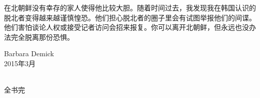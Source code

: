 在北朝鲜没有幸存的家人使得他比较大胆。随着时间过去，我发现我在韩国认识的脱北者变得越来越谨慎惶恐。他们担心脱北者的圈子里会有试图举报他们的间谍。他们害怕谈论人权或接受记者访问会招来报复。你可以离开北朝鲜，但永远也没办法完全脱离那份恐惧。\\

\begin{flushright}
	Barbara Demick\\

	2015年3月\\
\end{flushright}


\begin{center}
\begin{center}
	\textcolor{PinYinColor}
		{{\FA } \\
		全书完\\}
\end{center}
\end{center}
